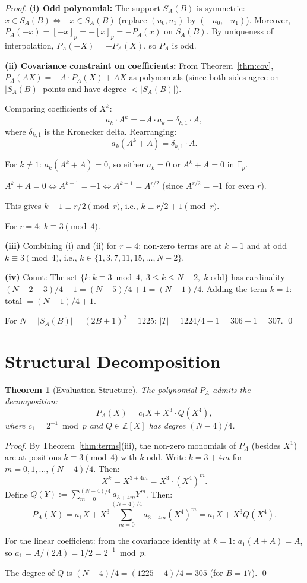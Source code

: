 \documentclass[11pt]{article}
\newtheorem{theorem}{Theorem}
\newcommand{\Fp}{\mathbb{F}_p}
\begin{document}
\begin{proof}
\textbf{(i) Odd polynomial:} The support $S_A(B)$ is symmetric: $x \in S_A(B) \Leftrightarrow -x \in S_A(B)$ (replace $(u_0, u_1)$ by $(-u_0, -u_1)$). Moreover, $P_A(-x) = [-x]_p = -[x]_p = -P_A(x)$ on $S_A(B)$. By uniqueness of interpolation, $P_A(-X) = -P_A(X)$, so $P_A$ is odd.

\textbf{(ii) Covariance constraint on coefficients:} From Theorem~\ref{thm:cov}, $P_A(AX) = -A \cdot P_A(X) + AX$ as polynomials (since both sides agree on $|S_A(B)|$ points and have degree $< |S_A(B)|$).

Comparing coefficients of $X^k$:
\[
a_k \cdot A^k = -A \cdot a_k + \delta_{k,1} \cdot A,
\]
where $\delta_{k,1}$ is the Kronecker delta. Rearranging:
\[
a_k (A^k + A) = \delta_{k,1} \cdot A.
\]

For $k \neq 1$: $a_k(A^k + A) = 0$, so either $a_k = 0$ or $A^k + A = 0$ in $\Fp$.

$A^k + A = 0 \Leftrightarrow A^{k-1} = -1 \Leftrightarrow A^{k-1} = A^{r/2}$ (since $A^{r/2} = -1$ for even $r$).

This gives $k - 1 \equiv r/2 \pmod{r}$, i.e., $k \equiv r/2 + 1 \pmod{r}$.

For $r = 4$: $k \equiv 3 \pmod{4}$.

\textbf{(iii)} Combining (i) and (ii) for $r=4$: non-zero terms are at $k=1$ and at odd $k \equiv 3 \pmod{4}$, i.e., $k \in \{1, 3, 7, 11, 15, \ldots, N-2\}$.

\textbf{(iv)} Count: The set $\{k : k \equiv 3 \bmod 4, \; 3 \leq k \leq N-2, \; k \text{ odd}\}$ has cardinality $(N-2-3)/4 + 1 = (N-5)/4 + 1 = (N-1)/4$. Adding the term $k=1$: total $= (N-1)/4 + 1$.

For $N = |S_A(B)| = (2B+1)^2 = 1225$: $|T| = 1224/4 + 1 = 306 + 1 = 307$. \qed
\end{proof}

\section{Structural Decomposition}

\begin{theorem}[Evaluation Structure]\label{thm:structure}
The polynomial $P_A$ admits the decomposition:
\[
P_A(X) = c_1 X + X^3 \cdot Q(X^4),
\]
where $c_1 = 2^{-1} \bmod p$ and $Q \in \mathbb{Z}[X]$ has degree $(N-4)/4$.
\end{theorem}

\begin{proof}
By Theorem~\ref{thm:terms}(iii), the non-zero monomials of $P_A$ (besides $X^1$) are at positions $k \equiv 3 \pmod{4}$ with $k$ odd. Write $k = 3 + 4m$ for $m = 0, 1, \ldots, (N-4)/4$. Then:
\[
X^k = X^{3+4m} = X^3 \cdot (X^4)^m.
\]
Define $Q(Y) := \sum_{m=0}^{(N-4)/4} a_{3+4m} Y^m$. Then:
\[
P_A(X) = a_1 X + X^3 \sum_{m=0}^{(N-4)/4} a_{3+4m} (X^4)^m = a_1 X + X^3 Q(X^4).
\]

For the linear coefficient: from the covariance identity at $k=1$:
$a_1(A + A) = A$, so $a_1 = A/(2A) = 1/2 = 2^{-1} \bmod p$.

The degree of $Q$ is $(N-4)/4 = (1225-4)/4 = 305$ (for $B=17$). \qed
\end{proof}
\end{document}
